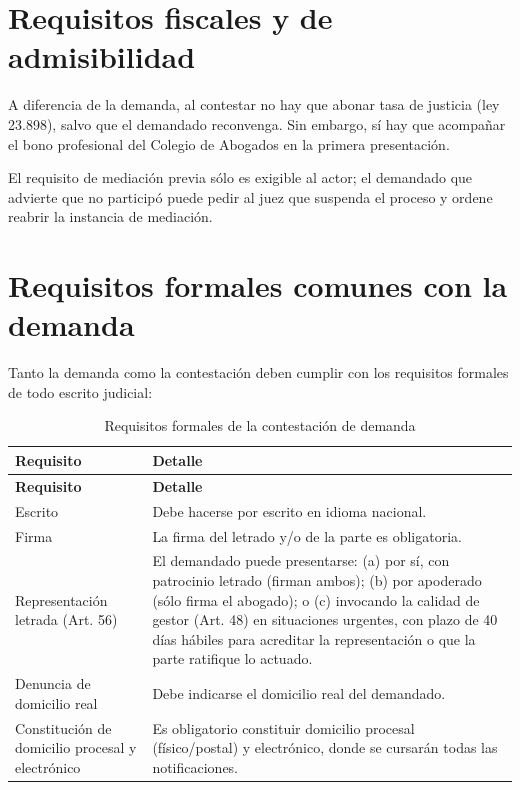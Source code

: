 \documentclass[12pt,oneside]{book}
\begin{document}
\section{Requisitos fiscales y de admisibilidad}

A diferencia de la demanda, al contestar no hay que abonar tasa de justicia (ley 23.898), salvo que el demandado reconvenga. Sin embargo, sí hay que acompañar el bono profesional del Colegio de Abogados en la primera presentación.

\begin{note}
El requisito de mediación previa sólo es exigible al actor; el demandado que advierte que no participó puede pedir al juez que suspenda el proceso y ordene reabrir la instancia de mediación.
\end{note}

\section{Requisitos formales comunes con la demanda}

Tanto la demanda como la contestación deben cumplir con los requisitos formales de todo escrito judicial:

\begin{longtable}{p{} p{}}
\caption{Requisitos formales de la contestación de demanda} \\
\toprule
\textbf{Requisito} & \textbf{Detalle} \\
\midrule
\endfirsthead
\toprule
\textbf{Requisito} & \textbf{Detalle} \\
\midrule
\endhead
Escrito & Debe hacerse por escrito en idioma nacional. \\
Firma & La firma del letrado y/o de la parte es obligatoria. \\
Representación letrada (Art. 56) & El demandado puede presentarse: (a) por sí, con patrocinio letrado (firman ambos); (b) por apoderado (sólo firma el abogado); o (c) invocando la calidad de gestor (Art. 48) en situaciones urgentes, con plazo de 40 días hábiles para acreditar la representación o que la parte ratifique lo actuado. \\
Denuncia de domicilio real & Debe indicarse el domicilio real del demandado. \\
Constitución de domicilio procesal y electrónico & Es obligatorio constituir domicilio procesal (físico/postal) y electrónico, donde se cursarán todas las notificaciones. \\
\bottomrule
\end{longtable}
\end{document}
